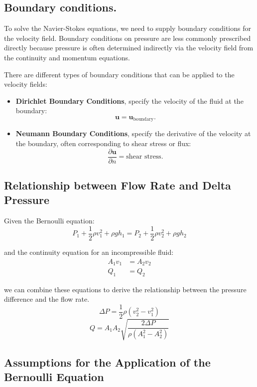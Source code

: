 \documentclass{article}
\begin{document}
\subsection{Boundary conditions.}
To solve the Navier-Stokes equations, we need to supply boundary conditions for the velocity field. Boundary conditions on pressure are less commonly prescribed directly because pressure is often determined indirectly via the velocity field from the continuity and momentum equations.

There are different types of boundary conditions that can be applied to the velocity fields:

\begin{itemize}
    \item \textbf{Dirichlet Boundary Conditions}, specify the velocity of the fluid at the boundary:
    \[
    \mathbf{u} = \mathbf{u}_{\text{boundary}}.
    \]

    \item \textbf{Neumann Boundary Conditions}, specify the derivative of the velocity at the boundary, often corresponding to shear stress or flux:
    \[
    \frac{\partial \mathbf{u}}{\partial n} = \text{shear stress}.
    \]
\end{itemize}

\subsection{Relationship between Flow Rate and Delta Pressure}
Given the Bernoulli equation:
\begin{equation}
P_1 + \frac{1}{2} \rho v_1^2 + \rho gh_1 = P_2 + \frac{1}{2} \rho v_2^2 + \rho gh_2
\end{equation}

and the continuity equation for an incompressible fluid:
\begin{align}
    A_1 v_1 &= A_2 v_2 \\
    Q_1 &= Q_2
\end{align}

we can combine these equations to derive the relationship between the pressure difference and the flow rate.
\begin{equation}
\Delta P = \frac{1}{2} \rho \left( v_2^2 - v_1^2 \right)
\end{equation}
\begin{equation}
Q = A_1 A_2\sqrt{\frac{2 \Delta P}{\rho \left( A_1^2 - A_2^2 \right)}}
\end{equation}

\subsection{Assumptions for the Application of the Bernoulli Equation}
\end{document}
